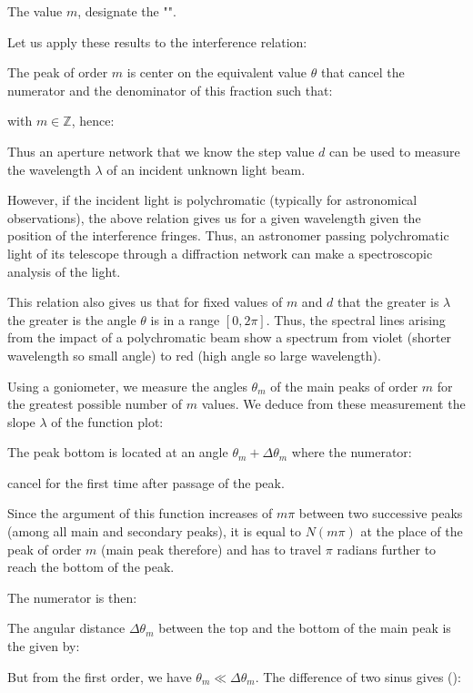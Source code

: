 	The value $m$, designate the "".

	Let us apply these results to the interference relation:
	
	The peak of order $m$ is center on the equivalent value $\theta$ that cancel the numerator and the denominator of this fraction such that:
	
	with $m\in\mathbb{Z}$, hence:
	
	Thus an aperture network that we know the step value $d$ can be used to measure the wavelength $\lambda$ of an incident unknown light beam.
	
	However, if the incident light is polychromatic (typically for astronomical observations), the above relation gives us for a given wavelength given the position of the interference fringes. Thus, an astronomer passing polychromatic light of its telescope through a diffraction network can make a spectroscopic analysis of the light.

	This relation also gives us that for fixed values of $m$ and $d$ that the greater is $\lambda$ the greater is the angle $\theta$ is in a range $[0,2\pi]$. Thus, the spectral lines arising from the impact of a polychromatic beam show a spectrum from violet (shorter wavelength so small angle) to red (high angle so large wavelength).

	Using a goniometer, we measure the angles $\theta_m$ of the main peaks of order $m$ for the greatest possible number of $m$ values. We deduce from these measurement the slope $\lambda$ of the function plot:
	
	The peak bottom is located at an angle $\theta_m+\Delta\theta_m$ where the numerator:
	
	cancel for the first time after passage of the peak.
	
	Since the argument of this function increases of $m\pi$ between two successive peaks (among all main and secondary peaks), it is equal to $N(m\pi)$ at the place of the peak of order $m$ (main peak therefore) and has to travel $\pi$ radians further to reach the bottom of the peak.

	The numerator is then:
	
	The angular distance $\Delta \theta_m$ between the top and the bottom of the main peak is the given by:
	
	But from the first order, we have $\theta_m \ll \Delta\theta_m$. The difference of two sinus gives ():
	
